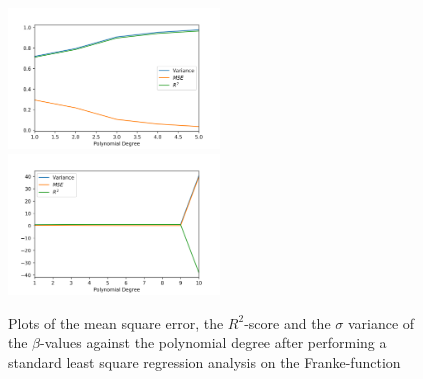 \documentclass[a4paper,10pt,english]{article}
\begin{document}
\begin{figure}[H]
	\centering 
	\includegraphics[width = 0.5\textwidth, center]{../franke_output/part_A.png}
	\includegraphics[width = 0.5\textwidth, center]{../franke_output/part_A_highdeg.png}
	\caption{
		Plots of the mean square error, the $R^2$-score and the $\sigma$ variance of the $\beta$-values against the polynomial degree after performing a standard least square regression analysis on the Franke-function
	}
	\label{part_a}
\end{figure}
\end{document}
